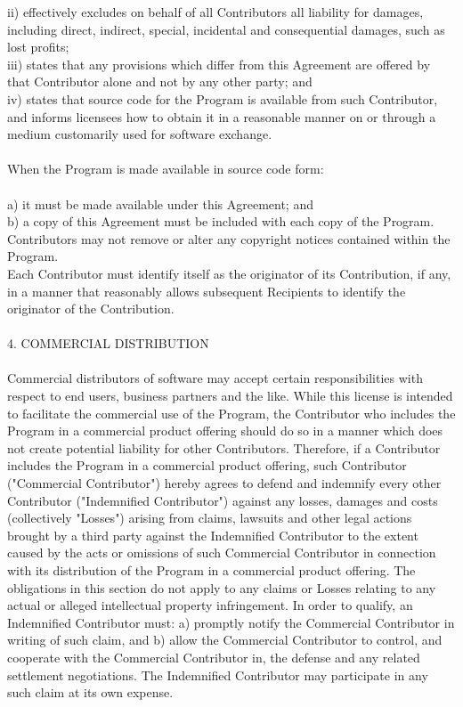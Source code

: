 \documentclass[a4paper, 12pt]{book}
\begin{document}
{ii) effectively excludes on behalf of all Contributors all liability for damages, including direct, indirect, special, incidental and consequential damages, such as lost profits;\\
iii) states that any provisions which differ from this Agreement are offered by that Contributor alone and not by any other party; and\\
iv) states that source code for the Program is available from such Contributor, and informs licensees how to obtain it in a reasonable manner on or through a medium customarily used for software exchange.\\
\\
When the Program is made available in source code form:\\
\\
a) it must be made available under this Agreement; and\\
b) a copy of this Agreement must be included with each copy of the Program.\\
Contributors may not remove or alter any copyright notices contained within the Program.\\
Each Contributor must identify itself as the originator of its Contribution, if any, in a manner that reasonably allows subsequent Recipients to identify the originator of the Contribution.\\
\\
4. COMMERCIAL DISTRIBUTION\\
\\
Commercial distributors of software may accept certain responsibilities with respect to end users, business partners and the like. While this license is intended to facilitate the commercial use of the Program, the Contributor who includes the Program in a commercial product offering should do so in a manner which does not create potential liability for other Contributors. Therefore, if a Contributor includes the Program in a commercial product offering, such Contributor ("Commercial Contributor") hereby agrees to defend and indemnify every other Contributor ("Indemnified Contributor") against any losses, damages and costs (collectively "Losses") arising from claims, lawsuits and other legal actions brought by a third party against the Indemnified Contributor to the extent caused by the acts or omissions of such Commercial Contributor in connection with its distribution of the Program in a commercial product offering. The obligations in this section do not apply to any claims or Losses relating to any actual or alleged intellectual property infringement. In order to qualify, an Indemnified Contributor must: a) promptly notify the Commercial Contributor in writing of such claim, and b) allow the Commercial Contributor to control, and cooperate with the Commercial Contributor in, the defense and any related settlement negotiations. The Indemnified Contributor may participate in any such claim at its own expense.\\
}
\end{document}
